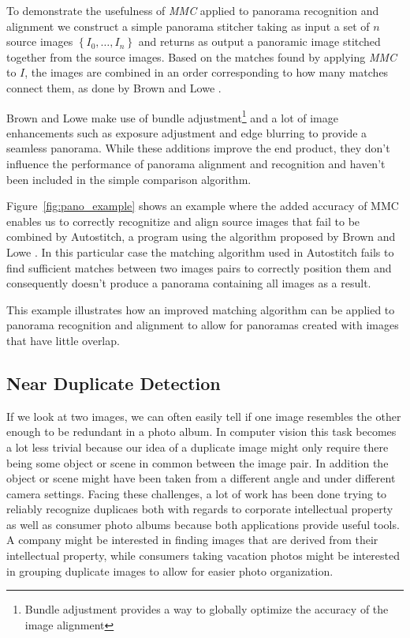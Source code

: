 To demonstrate the usefulness of \emph{MMC} applied to panorama 
recognition and alignment we construct a simple panorama stitcher taking
as input a set of $n$ source images $\left\{I_0, \ldots, I_n\right\}$ 
and returns as output a panoramic image stitched together from the 
source images. Based on the matches found by applying \emph{MMC} to $I$, 
the images are combined in an order corresponding to how many matches 
connect them, as done by Brown and Lowe \cite{brown2007automatic}.

Brown and Lowe make use of bundle adjustment\footnote{Bundle adjustment 
provides a way to globally optimize the accuracy of the image alignment} 
and a lot of image enhancements such as exposure adjustment and edge 
blurring to provide a seamless panorama. While these additions improve 
the end product, they don't influence the performance of panorama 
alignment and recognition and haven't been included in the simple 
comparison algorithm.

Figure~\ref{fig:pano_example} shows an example where the added accuracy 
of MMC enables us to correctly recognitize and align source images that 
fail to be combined by Autostitch, a program using the algorithm 
proposed by Brown and Lowe \cite{brown2007automatic}. In this particular
case the matching algorithm used in Autostitch fails to find sufficient 
matches between two images pairs to correctly position them and 
consequently doesn't produce a panorama containing all images as a 
result.

This example illustrates how an improved matching algorithm can be 
applied to panorama recognition and alignment to allow for panoramas 
created with images that have little overlap.

\subsection{Near Duplicate Detection}
If we look at two images, we can often easily tell if one image 
resembles the other enough to be redundant in a photo album. In computer 
vision this task becomes a lot less trivial because our idea of a 
duplicate image might only require there being some object or scene in 
common between the image pair. In addition the object or scene might 
have been taken from a different angle and under different camera 
settings. Facing these challenges, a lot of work has been done trying to 
reliably recognize duplicaes both with regards to corporate intellectual 
property as well as consumer photo albums because both applications 
provide useful tools.  A company might be interested in finding images 
that are derived from their intellectual property, while consumers 
taking vacation photos might be interested in grouping duplicate images 
to allow for easier photo organization.


